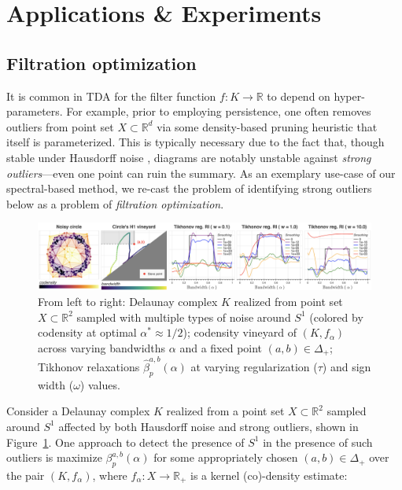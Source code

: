 \documentclass[pdflatex,sn-mathphys-num]{sn-jnl}
\begin{document}
\section{Applications \& Experiments}\label{sec:applications}

\subsection{Filtration optimization}\label{filtration-optimization}
It is common in TDA for the filter function \(f:K \rightarrow \mathbb{R}\) to depend on hyper-parameters. For example, prior to employing persistence, one often removes outliers from point set \(X \subset \mathbb{R}^{d}\) via some density-based pruning heuristic that itself is parameterized. This is typically necessary due to the fact that, though stable under Hausdorff noise \cite{cohen2005stability}, diagrams are notably unstable against \emph{strong outliers}---even one point can ruin the summary. As an exemplary use-case of our spectral-based method, we re-cast the problem of identifying strong outliers below as a problem of \emph{filtration optimization}.
\begin{figure}\label{fig:codensity_opt}
\centering
\includegraphics[width=1\linewidth,height=\textheight,keepaspectratio]{../images/codensity_ex.png}
\caption{From left to right: Delaunay complex \(K\) realized from point set \(X \subset \mathbb{R}^{2}\) sampled with multiple types of noise around \(S^{1}\) (colored by codensity at optimal \(\alpha^{\ast} \approx 1/2\)); codensity vineyard of \(\left( K,f_{\alpha} \right)\) across varying bandwidths \(\alpha\) and a fixed point \((a,b) \in \Delta_{+}\); Tikhonov relaxations \({\hat{\beta}}_{p}^{a,b}(\alpha)\) at varying regularization (\(\tau\)) and sign width (\(\omega\)) values.}
\end{figure}
Consider a Delaunay complex \(K\) realized from a point set \(X \subset \mathbb{R}^{2}\) sampled around \(S^{1}\) affected by both Hausdorff noise and strong outliers, shown in Figure~\ref{fig:codensity_opt}. One approach to detect the presence of \(S^{1}\) in the presence of such outliers is maximize \(\beta_{p}^{a,b}(\alpha)\) for some appropriately chosen \((a,b) \in \Delta_{+}\) over the pair \(\left( K,f_{\alpha} \right)\), where \(f_{\alpha}:X \rightarrow \mathbb{R}_{+}\) is a kernel (co)-density estimate:
\end{document}
